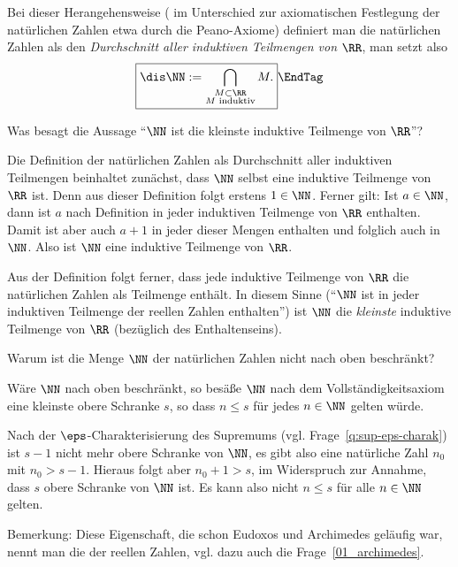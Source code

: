 \begin{antwort}
  Bei dieser Herangehensweise ({\dasheisst} im Unterschied zur axiomatischen 
  Festlegung der natürlichen Zahlen etwa durch die Peano-Axiome)
  definiert man die natürlichen Zahlen als 
  den \textit{Durchschnitt aller induktiven Teilmengen von $\RR$}, man setzt 
  also
  \begin{equation}
    \boxed{
      \dis \NN := \bigcap_{\substack{M \subset \RR \\ \text{$M$ induktiv}}} M.
    }
    \EndTag
  \end{equation}
\end{antwort}


\begin{frage} 
  Was besagt die Aussage 
  "`$\NN$ ist die kleinste induktive Teilmenge von $\RR$"'?
\end{frage}

\begin{antwort}
  Die Definition der natürlichen Zahlen als Durchschnitt aller 
  induktiven Teilmengen beinhaltet zunächst, dass $\NN$ selbst eine induktive 
  Teilmenge von $\RR$ ist. Denn aus dieser Definition folgt erstens
  $1\in\NN$. Ferner gilt: Ist $a\in \NN$, dann ist $a$ nach Definition in 
  jeder induktiven Teilmenge von $\RR$ enthalten. 
  Damit ist aber auch $a+1$ in jeder dieser Mengen enthalten und 
  folglich auch in $\NN$. 
  Also ist $\NN$ eine induktive Teilmenge von $\RR$.

  Aus der Definition folgt ferner, 
  dass jede induktive Teilmenge von $\RR$ 
  die natürlichen Zahlen als Teilmenge enthält. 
  In diesem Sinne ("`$\NN$ ist in jeder induktiven Teilmenge der reellen 
  Zahlen enthalten"') ist $\NN$ die \textit{kleinste} induktive Teilmenge von $\RR$ (bezüglich des Enthaltenseins).
  \AntEnd
\end{antwort}


\begin{frage}%
  \label{q:archimedische-eigenschaft}
  Warum ist die Menge $\NN$ der natürlichen Zahlen nicht nach oben beschränkt?
\end{frage}

\begin{antwort}
  Wäre $\NN$ nach oben beschränkt, so besäße $\NN$ nach 
  dem Vollständigkeitsaxiom eine kleinste obere Schranke $s$, so dass 
  $n\le s$ für jedes $n\in\NN$ gelten würde.
  
  Nach der $\eps$-Charakterisierung des Supremums (vgl. Frage~\ref{q:sup-eps-charak}) 
  ist $s-1$ nicht mehr obere Schranke von $\NN$, es gibt also eine natürliche Zahl 
  $n_0$ mit $n_0>s-1$. Hieraus folgt aber $n_0+1 > s$, im Widerspruch zur Annahme, dass 
  $s$ obere Schranke von $\NN$ ist. Es kann also nicht $n\le s$ für alle $n\in\NN$ gelten.

  \medskip
  \noindent
  Bemerkung: Diese Eigenschaft, die schon Eudoxos und Archimedes 
  geläufig war, nennt man die 
  der reellen Zahlen, vgl. dazu auch die Frage~\ref{01_archimedes}. \AntEnd
  \end{antwort}

